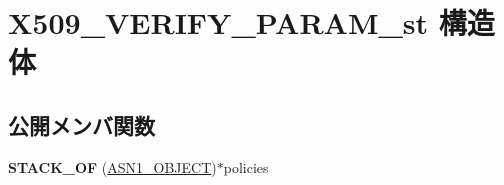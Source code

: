 \hypertarget{struct_x509___v_e_r_i_f_y___p_a_r_a_m__st}{}\section{X509\+\_\+\+V\+E\+R\+I\+F\+Y\+\_\+\+P\+A\+R\+A\+M\+\_\+st 構造体}
\label{struct_x509___v_e_r_i_f_y___p_a_r_a_m__st}
\subsection*{公開メンバ関数}
\begin{DoxyCompactItemize}
\item 
\hypertarget{struct_x509___v_e_r_i_f_y___p_a_r_a_m__st_a5087643f8379670666afff2ef319f0f2}{}{\bfseries S\+T\+A\+C\+K\+\_\+\+O\+F} (\hyperlink{structasn1__object__st}{A\+S\+N1\+\_\+\+O\+B\+J\+E\+C\+T})$\ast$policies\label{struct_x509___v_e_r_i_f_y___p_a_r_a_m__st_a5087643f8379670666afff2ef319f0f2}

\end{DoxyCompactItemize}
